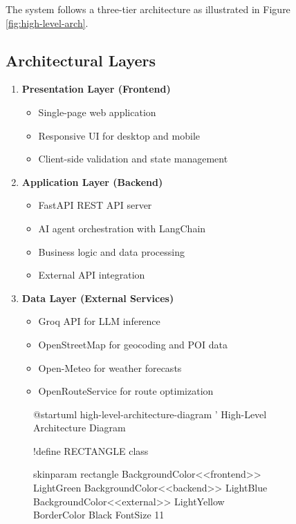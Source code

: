 \documentclass[12pt,a4paper]{report}
\begin{document}
\begin{figure}[H]
\begin{plantuml}
The system follows a three-tier architecture as illustrated in Figure \ref{fig:high-level-arch}.

\subsection{Architectural Layers}

\begin{enumerate}[leftmargin=*]
    \item \textbf{Presentation Layer (Frontend)}
    \begin{itemize}
        \item Single-page web application
        \item Responsive UI for desktop and mobile
        \item Client-side validation and state management
    \end{itemize}
    
    \item \textbf{Application Layer (Backend)}
    \begin{itemize}
        \item FastAPI REST API server
        \item AI agent orchestration with LangChain
        \item Business logic and data processing
        \item External API integration
    \end{itemize}
    
    \item \textbf{Data Layer (External Services)}
    \begin{itemize}
        \item Groq API for LLM inference
        \item OpenStreetMap for geocoding and POI data
        \item Open-Meteo for weather forecasts
        \item OpenRouteService for route optimization
    \end{itemize}
\end{enumerate}

\begin{figure}[H]
    \centering
    \begin{plantuml}
@startuml high-level-architecture-diagram
' High-Level Architecture Diagram

!define RECTANGLE class

skinparam rectangle {
    BackgroundColor<<frontend>> LightGreen
    BackgroundColor<<backend>> LightBlue
    BackgroundColor<<external>> LightYellow
    BorderColor Black
    FontSize 11
}


\end{plantuml}
\end{figure}
\end{plantuml}
\end{figure}
\end{document}
